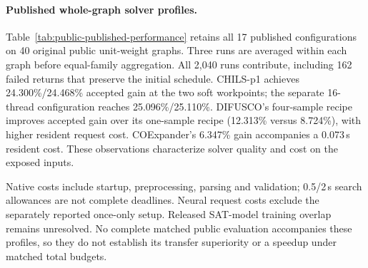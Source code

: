 \paragraph{Published whole-graph solver profiles.}
Table~\ref{tab:public-published-performance} retains all 17 published
configurations on 40 original public unit-weight graphs. Three runs are
averaged within each graph before equal-family aggregation. All 2,040
runs contribute, including 162 failed returns that preserve the initial
schedule. CHILS-p1 achieves 24.300\%/24.468\% accepted gain at the two
soft workpoints; the separate 16-thread configuration reaches
25.096\%/25.110\%. DIFUSCO's four-sample recipe improves accepted gain
over its one-sample recipe (12.313\% versus 8.724\%), with higher resident
request cost. COExpander's 6.347\% gain accompanies a 0.073\,s resident
cost. These observations characterize solver quality and cost on the
exposed inputs.

Native costs include startup, preprocessing, parsing and validation;
0.5/2\,s search allowances are not complete deadlines. Neural request
costs exclude the separately reported once-only setup. Released SAT-model
training overlap remains unresolved. No complete matched \method{} public
evaluation accompanies these profiles, so they do not establish its
transfer superiority or a speedup under matched total budgets.


